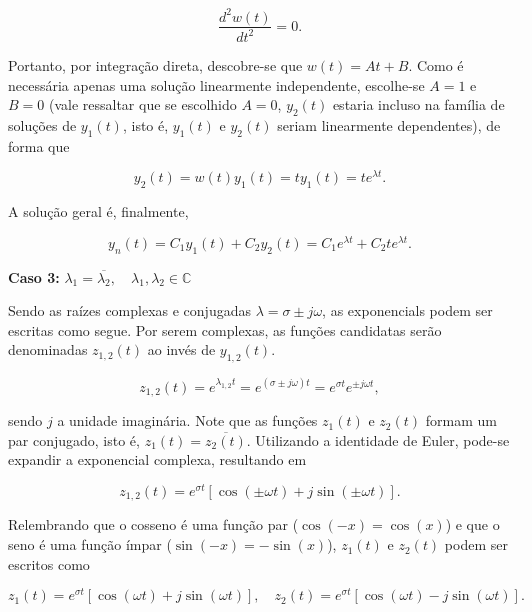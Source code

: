 \documentclass{article}
\numberwithin{equation}{section}
\let\dfr\dfrac
\newcommand{\itembull}[1]{\noindent\textbf{\small{\textbullet \hspace{1.5mm}#1}}}
\begin{document}
\begin{equation}
    \dfr{d^2w(t)}{dt^2} = 0. \label{eq:dalembert_3}
\end{equation}

\noindent Portanto, por integração direta, descobre-se que $w(t)=At+B$. Como é necessária apenas uma solução linearmente independente, escolhe-se $A=1$ e $B=0$ (vale ressaltar que se escolhido $A=0$, $y_2(t)$ estaria incluso na família de soluções de $y_1(t)$, isto é, $y_1(t)$ e $y_2(t)$ seriam linearmente dependentes), de forma que

\begin{equation*}
    y_2(t) = w(t)y_1(t) = ty_1(t) = te^{\lambda t}.
\end{equation*}

\noindent A solução geral é, finalmente,

\begin{equation}
    y_n(t) = C_1y_1(t)+C_2y_2(t) = C_1e^{\lambda t}+C_2te^{\lambda t}.
\end{equation}

\vspace{3mm}

\itembull{Caso 3:} $\lambda_{1} = \overline{\lambda_{2}}, \quad \lambda_{1},\lambda_{2} \in \mathbb{C}$

Sendo as raízes complexas e conjugadas $\lambda = \sigma \pm j\omega$, as exponencials podem ser escritas como segue. Por serem complexas, as funções candidatas serão denominadas $z_{1,2}(t)$ ao invés de $y_{1,2}(t)$.

\begin{equation*}
    z_{1,2}(t)=e^{\lambda_{1,2} t} = e^{(\sigma \pm j\omega) t} = e^{\sigma t}e^{\pm j\omega t},
\end{equation*}

\noindent sendo $j$ a unidade imaginária. Note que as funções $z_1(t)$ e $z_2(t)$ formam um par conjugado, isto é, $z_1(t)=\overline{z_2(t)}$. Utilizando a identidade de Euler, pode-se expandir a exponencial complexa, resultando em

\begin{equation*}
    z_{1,2}(t)=e^{\sigma t}[\cos{(\pm \omega t)}+j\sin{(\pm \omega t)}].
\end{equation*}

\noindent Relembrando que o cosseno é uma função par ($\cos(-x) = \cos(x)$) e que o seno é uma função ímpar ($\sin(-x) = -\sin(x)$), $z_1(t)$ e $z_2(t)$ podem ser escritos como

\begin{equation}
    z_1(t) = e^{\sigma t}[\cos{(\omega t)}+j\sin{(\omega t)}], \quad
    z_2(t) = e^{\sigma t}[\cos{(\omega t)}-j\sin{(\omega t)}]. \label{eq:complexos1}
\end{equation}
\end{document}
